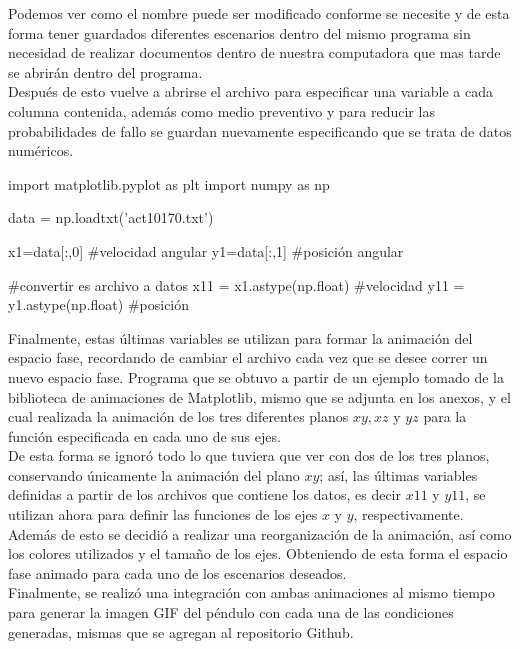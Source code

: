 \documentclass[12pt]{article}
\begin{document}
Podemos ver como el nombre puede ser modificado conforme se necesite y de esta forma tener guardados diferentes escenarios dentro del mismo programa sin necesidad de realizar documentos dentro de nuestra computadora que mas tarde se abrirán dentro del programa.\\

Después de esto vuelve a abrirse el archivo para especificar una variable a cada columna contenida, además como medio preventivo y para reducir las probabilidades de fallo se guardan nuevamente especificando que se trata de datos numéricos.\\

\begin{center}
\begin{boxedverbatim}
import matplotlib.pyplot as plt 
import numpy as np

data = np.loadtxt('act10170.txt')

x1=data[:,0] #velocidad angular
y1=data[:,1] #posición angular


#convertir es archivo a datos
x11 = x1.astype(np.float) #velocidad
y11 = y1.astype(np.float) #posición
\end{boxedverbatim}
\end{center}

Finalmente, estas últimas variables se utilizan para formar la animación del espacio fase, recordando de cambiar el archivo cada vez que se desee correr un nuevo espacio fase. Programa que se obtuvo a partir de un ejemplo tomado de la biblioteca de animaciones de Matplotlib, mismo que se adjunta en los anexos, y el cual realizada la animación de los tres diferentes planos $xy, xz$ y $yz$ para la función especificada en cada uno de sus ejes.\\

De esta forma se ignoró todo lo que tuviera que ver con dos de los tres planos, conservando únicamente la animación del plano $xy$; así, las últimas variables definidas a partir de los archivos que contiene los datos, es decir $x11$ y $y11$, se utilizan ahora para definir las funciones de los ejes $x$ y $y$, respectivamente. Además de esto se decidió a realizar una reorganización de la animación, así como los colores utilizados y el tamaño de los ejes. Obteniendo de esta forma el espacio fase animado para cada uno de los escenarios deseados.\\

Finalmente, se realizó una integración con ambas animaciones al mismo tiempo para generar la imagen GIF del péndulo con cada una de las condiciones generadas, mismas que se agregan al repositorio Github.
\end{document}
